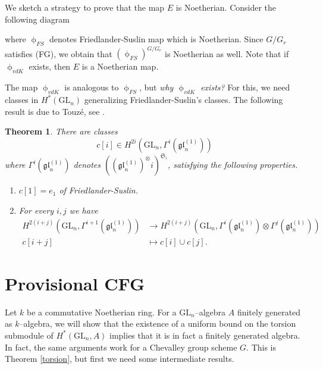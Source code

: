 \documentclass{article}
\theoremstyle{plain}
\newtheorem{Th}{Theorem}[section]
\theoremstyle{definition}
\newcommand{\GL}{\mathrm{GL}}
\begin{document}
We sketch a strategy to prove that the map $E$ is Noetherian. Consider the following diagram 
\begin{center}
    \end{center}
\noindent where $\upphi_{FS}$ denotes Friedlander-Suslin map which is Noetherian. Since $G/G_r$ satisfies (FG), we obtain that $(\upphi_{FS})^{G/G_r}$ is Noetherian as well. Note that if $\upphi_{vdK}$ exists, then $E$ is a Noetherian map. 

The map $\upphi_{vdK}$ is analogous to $\upphi_{FS}$, but \textit{why $\upphi_{vdK}$ exists?}  For this, we need classes in $H^\ast(\GL_n)$ generalizing Friedlander-Suslin's classes. The following result is due to Touz\'e, see \cite{Tou10}.

\begin{Th}\label{Thm Touze}
There are classes 
\[
c[i]\in H^{2i}(\GL_n,\Gamma^i(\mathfrak{gl}_n^{(1)}))
\]
where $\Gamma^i(\mathfrak{gl}_n^{(1)})$ denotes $((\mathfrak{gl}_n^{(1)})^\otimes i)^{\mathfrak{S}_i}$, satisfying the following properties. 
\begin{enumerate}
    \item $c[1]=e_1$ of Friedlander-Suslin.
    \item For every $i,j$ we have 
    \begin{align*}
        H^{2(i+j)}(\GL_n,\Gamma^{i+1}(\mathfrak{gl}_n^{(1)})) & \to H^{2(i+j)}(\GL_n, \Gamma^i(\mathfrak{gl}_n^{(1)})\otimes \Gamma^j(\mathfrak{gl}_n^{(1)}))\\ 
        c[i+j] & \mapsto c[i]\cup c[j].
    \end{align*}
\end{enumerate}
\end{Th}


\pagebreak

\section{Provisional CFG}\label{section:provisionalCFG}


Let $k$ be a commutative Noetherian ring. 
For a $\GL_n$--algebra $A$ finitely generated as $k$--algebra, we will show that the existence of a uniform bound on the torsion submodule of $H^*(\GL_n, A)$ implies that it is in fact a finitely generated algebra. In fact, the same arguments work for a Chevalley group scheme $G$.  This is Theorem \ref{torsion}, but first we need some intermediate results. 
\end{document}
